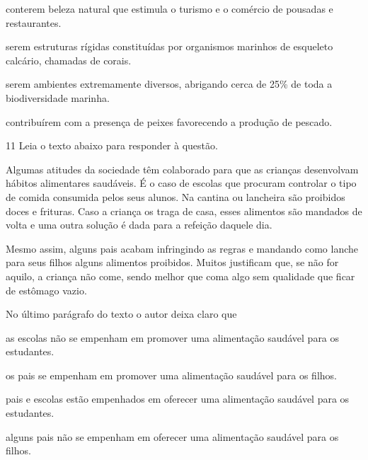 \begin{escolha}
    
    \item conterem beleza natural que estimula o turismo e o comércio de
  pousadas e restaurantes.
    
    \item serem estruturas rígidas constituídas por organismos marinhos de
  esqueleto calcário, chamadas de corais.
    
    \item serem ambientes extremamente diversos, abrigando cerca de 25\% de
  toda a biodiversidade marinha.
    
    \item contribuírem com a presença de peixes favorecendo a produção de
  pescado.

\end{escolha}

\num{11} Leia o texto abaixo para responder à questão. 

\begin{myquote}

Algumas atitudes da sociedade têm colaborado para que as crianças
desenvolvam hábitos alimentares saudáveis. É o caso de escolas que
procuram controlar o tipo de comida consumida pelos seus alunos. Na
cantina ou lancheira são proibidos doces e frituras. Caso a criança os
traga de casa, esses alimentos são mandados de volta e uma outra solução
é dada para a refeição daquele dia.

Mesmo assim, alguns pais acabam infringindo as regras e mandando como
lanche para seus filhos alguns alimentos proibidos. Muitos justificam
que, se não for aquilo, a criança não come, sendo melhor que coma algo
sem qualidade que ficar de estômago vazio.

\end{myquote}


No último parágrafo do texto o autor deixa claro que

\begin{escolha}
    
    \item as escolas não se empenham em promover uma alimentação saudável para os
  estudantes.
    
    \item os pais se empenham em promover uma alimentação saudável para os
  filhos.
    
    \item pais e escolas estão empenhados em oferecer uma alimentação saudável para
  os estudantes.
    
    \item alguns pais não se empenham em oferecer uma alimentação saudável para os filhos.

\end{escolha}

